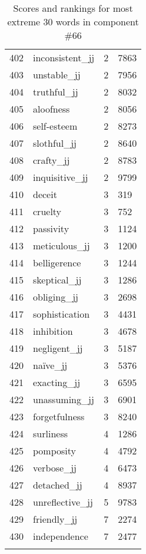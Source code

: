\begin{longtable}[!htbp]{| rlr@{.}l |}
    402 & inconsistent\_jj & 2 & 7863 \\
    403 & unstable\_jj & 2 & 7956 \\
    404 & truthful\_jj & 2 & 8032 \\
    405 & aloofness & 2 & 8056 \\
    406 & self-esteem & 2 & 8273 \\
    407 & slothful\_jj & 2 & 8640 \\
    408 & crafty\_jj & 2 & 8783 \\
    409 & inquisitive\_jj & 2 & 9799 \\
    410 & deceit & 3 & 319 \\
    411 & cruelty & 3 & 752 \\
    412 & passivity & 3 & 1124 \\
    413 & meticulous\_jj & 3 & 1200 \\
    414 & belligerence & 3 & 1244 \\
    415 & skeptical\_jj & 3 & 1286 \\
    416 & obliging\_jj & 3 & 2698 \\
    417 & sophistication & 3 & 4431 \\
    418 & inhibition & 3 & 4678 \\
    419 & negligent\_jj & 3 & 5187 \\
    420 & naïve\_jj & 3 & 5376 \\
    421 & exacting\_jj & 3 & 6595 \\
    422 & unassuming\_jj & 3 & 6901 \\
    423 & forgetfulness & 3 & 8240 \\
    424 & surliness & 4 & 1286 \\
    425 & pomposity & 4 & 4792 \\
    426 & verbose\_jj & 4 & 6473 \\
    427 & detached\_jj & 4 & 8937 \\
    428 & unreflective\_jj & 5 & 9783 \\
    429 & friendly\_jj & 7 & 2274 \\
    430 & independence & 7 & 2477 \\
    \hline
    \caption{Scores and rankings for most extreme 30 words in component \#66} \\
\end{longtable}
